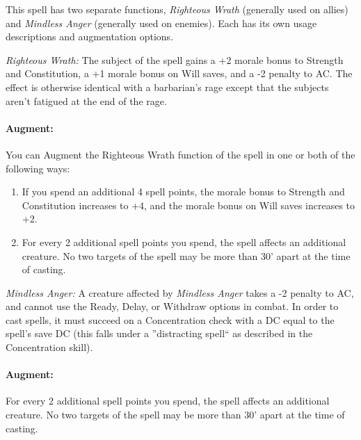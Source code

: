 This spell has two separate functions, \emph{Righteous Wrath} (generally used on allies) and \emph{Mindless Anger} (generally used on enemies). 
Each has its own usage descriptions and augmentation options.
\begin{list}{}{\leftmargin=1em}
 \item \emph{Righteous Wrath:}
The subject of the spell gains a +2 morale bonus to Strength and Constitution, 
a +1 morale bonus on Will saves, and a -2 penalty to AC. 
The effect is otherwise identical with a barbarian's rage except that the subjects aren't fatigued at the end of the rage.

\paragraph{Augment:} You can Augment the Righteous Wrath function of the spell in one or both of the following ways:
\begin{enumerate}
 \item If you spend an additional 4 spell points, the morale bonus to Strength and Constitution increases to +4, and the morale bonus on Will
saves increases to +2.
 \item For every 2 additional spell points you spend, the spell affects an additional creature. No two targets of the spell may be more than 30' apart
 at the time of casting.
\end{enumerate}
\item \emph{Mindless Anger:} A creature affected by \emph{Mindless Anger} takes a -2 penalty to AC, 
and cannot use the Ready, Delay, or Withdraw options in combat. In order to cast spells, it must succeed on a Concentration check with a DC equal to the spell's save DC (this falls under a ''distracting spell`` as described in the Concentration skill).

\paragraph{Augment:} %
 For every 2 additional spell points you spend, the spell affects an additional creature. No two targets of the spell may be more than 30' apart
 at the time of casting.
\end{list}
